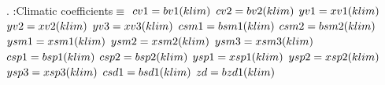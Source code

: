 .
\WY\WP\4\4:Climatic coefficients\X \X${}\equiv{}$\7
${}\\{cv1}=\\{bv1}(\\{klim})$\6
${}\\{cv2}=\\{bv2}(\\{klim})$\6
${}\\{yv1}=\\{xv1}(\\{klim})$\6
${}\\{yv2}=\\{xv2}(\\{klim})$\6
${}\\{yv3}=\\{xv3}(\\{klim})$\6
${}\\{csm1}=\\{bsm1}(\\{klim})$\6
${}\\{csm2}=\\{bsm2}(\\{klim})$\6
${}\\{ysm1}=\\{xsm1}(\\{klim})$\6
${}\\{ysm2}=\\{xsm2}(\\{klim})$\6
${}\\{ysm3}=\\{xsm3}(\\{klim})$\6
${}\\{csp1}=\\{bsp1}(\\{klim})$\6
${}\\{csp2}=\\{bsp2}(\\{klim})$\6
${}\\{ysp1}=\\{xsp1}(\\{klim})$\6
${}\\{ysp2}=\\{xsp2}(\\{klim})$\6
${}\\{ysp3}=\\{xsp3}(\\{klim})$\6
${}\\{csd1}=\\{bsd1}(\\{klim})$\6
${}\\{zd}=\\{bzd1}(\\{klim})$\6
